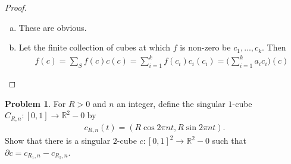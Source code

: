 \documentclass[20pt]{article}
\theoremstyle{plain}
\theoremstyle{definition}
\newtheorem*{problem}{Problem}
\newcommand{\reals}{\mathbb{R}}
\begin{document}
\begin{proof}
  \begin{enumerate}[(a)]
    \item
      These are obvious.
    \item
      Let the finite collection of cubes at which $f$ is non-zero be
      $c_1, ..., c_k$.  Then
      \begin{align*}
        f(c) = \sum_S f(c)c(c) = \sum_{i=1}^kf(c_i)c_i(c_i) = \bigg(\sum_{i=1}^ka_i c_i\bigg)(c)
      \end{align*}
  \end{enumerate}
\end{proof}









\begin{problem}{4.23}
  For $R > 0$ and $n$ an integer, define the singular $1$-cube
  $C_{R, n} : [0, 1] \to \reals^2 - 0$ by
  \begin{align*}
    c_{R, n}(t) = (R \cos 2 \pi n t, R \sin 2 \pi n t).
  \end{align*}
  Show that there is a singular $2$-cube $c: [0,1]^2 \to \reals^2- 0$
   such that $\partial c = c_{R_1, n} - c_{R_2, n}$.
\end{problem}
\end{document}
